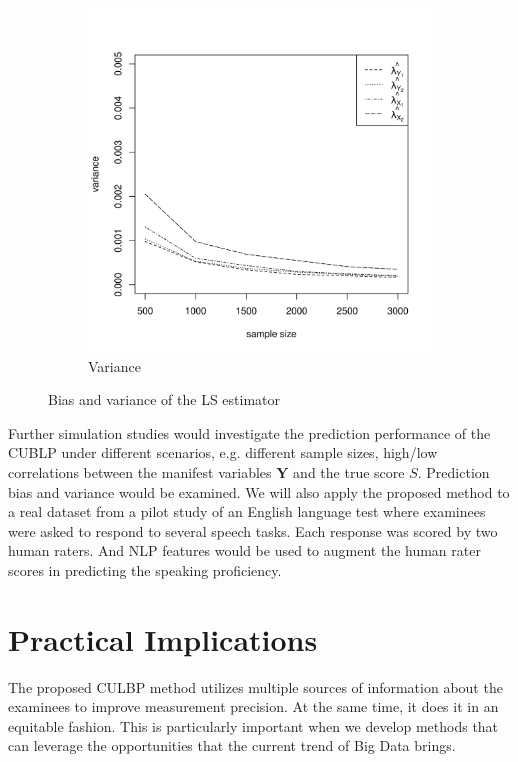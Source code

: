 \documentclass[man, floatsintext]{apa7}
\newcommand{\mbf}[1]{\bm{#1}}
\newcommand{\bY}{\mbf{Y}}
\begin{document}
\begin{figure}
\begin{subfigure}[b]{0.4\textwidth}
      \includegraphics[width=\textwidth]{var_uneq_discrim_high.png}
      \caption{Variance}
    \end{subfigure}
    \caption{Bias and variance of the LS estimator}
    \label{fig:ls_bias_var}
  \end{figure}
  Further simulation studies would investigate the prediction performance of the
  CUBLP under different scenarios, e.g. different sample sizes, high/low
  correlations between the manifest variables $\bY$ and the true score $S$.
  Prediction bias and variance would be examined. We will also apply the
  proposed method to a real dataset from a pilot study of an
  English language test where examinees were asked to respond to several speech
  tasks. Each response was scored by two human raters. And NLP features would be
  used to augment the human rater scores in predicting the speaking proficiency.

  \section{Practical Implications}
  The proposed CULBP method utilizes multiple sources of information
  about the examinees to improve measurement precision. At the same time, it
  does it in an equitable fashion. This is particularly important when we
  develop methods that can leverage the opportunities that the current trend of
  Big Data brings.
\end{document}
